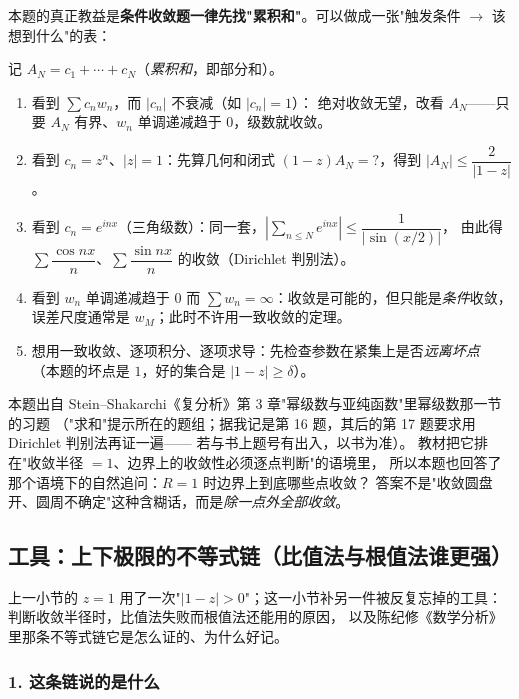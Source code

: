 \begin{remark}\label{rem:cond-vs-abs}
本题的真正教益是\textbf{条件收敛题一律先找"累积和"}。可以做成一张"触发条件 $\to$ 该想到什么"的表：

\medskip
\noindent
记 $A_N=c_1+\cdots+c_N$（\emph{累积和}，即部分和）。
\begin{enumerate}[label=(\arabic*), leftmargin=2.2em]
\item 看到 $\sum c_nw_n$，而 $|c_n|$ 不衰减（如 $|c_n|=1$）：
绝对收敛无望，改看 $A_N$——只要 $A_N$ 有界、$w_n$ 单调递减趋于 $0$，级数就收敛。
\item 看到 $c_n=z^n$、$|z|=1$：先算几何和闭式 $(1-z)A_N=?$，得到 $|A_N|\le\dfrac{2}{|1-z|}$。
\item 看到 $c_n=e^{inx}$（三角级数）：同一套，$|\sum_{n\le N}e^{inx}|\le\dfrac{1}{|\sin(x/2)|}$，
由此得 $\sum\dfrac{\cos nx}{n}$、$\sum\dfrac{\sin nx}{n}$ 的收敛（Dirichlet 判别法）。
\item 看到 $w_n$ 单调递减趋于 $0$ 而 $\sum w_n=\infty$：收敛是可能的，但只能是\emph{条件}收敛，
误差尺度通常是 $w_M$；此时不许用一致收敛的定理。
\item 想用一致收敛、逐项积分、逐项求导：先检查参数在紧集上是否\emph{远离坏点}
（本题的坏点是 $1$，好的集合是 $|1-z|\ge\delta$）。
\end{enumerate}
\end{remark}

\begin{remark}\label{rem:stein-loc}
本题出自 Stein--Shakarchi《复分析》第 3 章"幂级数与亚纯函数"里幂级数那一节的习题
（"求和"提示所在的题组；据我记是第 16 题，其后的第 17 题要求用 Dirichlet 判别法再证一遍——
若与书上题号有出入，以书为准）。
教材把它排在"收敛半径 $=1$、边界上的收敛性必须逐点判断"的语境里，
所以本题也回答了那个语境下的自然追问：$R=1$ 时边界上到底哪些点收敛？
答案不是"收敛圆盘开、圆周不确定"这种含糊话，而是\emph{除一点外全部收敛}。
\end{remark}

\subsection{工具：上下极限的不等式链（比值法与根值法谁更强）}
\label{sec:limsup-tools}

上一小节的 $z=1$ 用了一次"$|1-z|>0$"；这一小节补另一件被反复忘掉的工具：
判断收敛半径时，比值法失败而根值法还能用的原因，
以及陈纪修《数学分析》里那条不等式链它是怎么证的、为什么好记。

\subsubsection*{1. 这条链说的是什么}

